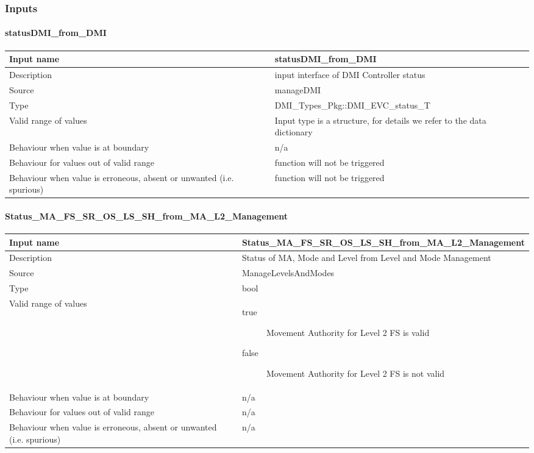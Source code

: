 \subsubsection{Inputs}\label{s:etcs_procedures_inputs}

\paragraph{statusDMI\_from\_DMI}

\begin{longtable}{p{}p{}}
\toprule
Input name				& statusDMI\_from\_DMI \\
\midrule
Description				& input interface of DMI Controller status \\
\midrule
Source					& manageDMI  \\ 
\midrule
Type					& DMI\_Types\_Pkg::DMI\_EVC\_status\_T \\
\midrule
Valid range of values	& Input type is a structure, for details we refer to the data dictionary \\
\midrule
Behaviour when value is at boundary	& n/a \\
\midrule
Behaviour for values out of valid range	& function will not be triggered  \\
\midrule
Behaviour when value is erroneous, absent or unwanted (i.e. spurious) & function will not be triggered \\
\bottomrule
\end{longtable}


\paragraph{Status\_MA\_FS\_SR\_OS\_LS\_SH\_from\_MA\_L2\_Management}

\begin{longtable}{p{}p{}}
\toprule
Input name				& Status\_MA\_FS\_SR\_OS\_LS\_SH\_from\_MA\_L2\_Management \\
\midrule
Description				& Status of MA, Mode and Level from Level and Mode Management \\
\midrule
Source					& ManageLevelsAndModes \\ 
\midrule
Type					& bool \\
\midrule
Valid range of values	& \begin{description}
\item[true]Movement Authority for Level 2 FS is valid
\item[false]Movement Authority for Level 2 FS is not valid
\end{description} \\
\midrule
Behaviour when value is at boundary	& n/a \\
\midrule
Behaviour for values out of valid range	& n/a \\
\midrule
Behaviour when value is erroneous, absent or unwanted (i.e. spurious) & n/a \\
\bottomrule
\end{longtable}

